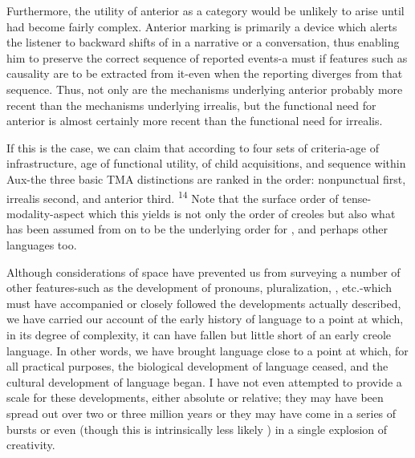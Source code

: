 Furthermore, the utility of anterior as a category would be unlikely to arise until  had become fairly complex. Anterior marking is primarily a device which alerts the listener to backward shifts of  in a narrative or a conversation, thus enabling him to preserve the correct sequence of reported events-a must if features such as causality are to be extracted from it-even when the reporting diverges from that sequence. Thus, not only are the mechanisms under\-lying anterior probably more recent than the mechanisms underlying irrealis, but the functional need for anterior is almost certainly more recent than the functional need for irrealis.

If this is the case, we can claim that according to four sets of criteria-age of infrastructure, age of functional utility,  of child acquisitions, and sequence within Aux-the three basic TMA distinc\-tions are ranked in the order: nonpunctual first, irrealis second, and anterior third. \textsuperscript{1}\textsuperscript{4} Note that the surface order of tense-modality-aspect which this yields is not only the order of creoles but also what has been assumed from \citet{Chomsky1957} on to be the underlying order for , and perhaps other languages too.

Although considerations of space have prevented us from survey\-ing a number of other features-such as the development of pronouns, pluralization, , etc.-which must have accompanied or closely followed the developments actually described, we have carried our account of the early history of language to a point at which, in its
degree of complexity, it can have fallen but little short of an early creole language. In other words, we have brought language close to a point at which, for all practical purposes, the biological development of language ceased, and the cultural development of language began. I have not even attempted to provide a  scale for these develop\-ments, either absolute or relative; they may have been spread out over two or three million years or they may have come in a series of bursts or even (though this is intrinsically less likely ) in a single explosion of creativity.

